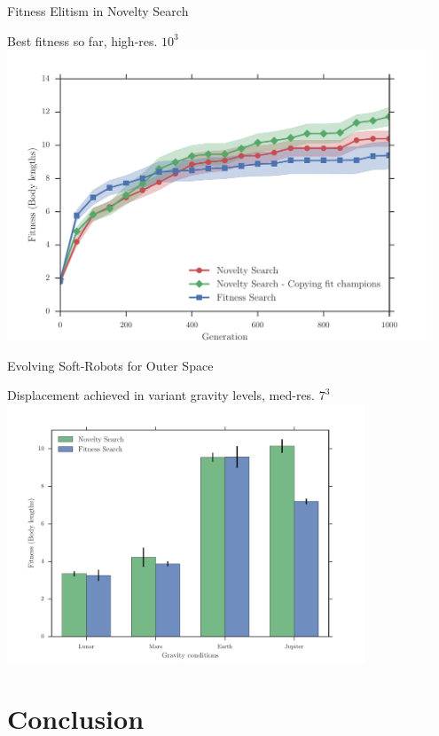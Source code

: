 \documentclass[6pt]{beamer}
\begin{document}
{\begin{frame}{Fitness Elitism in Novelty Search}
\begin{block}{Best fitness so far, high-res. $10^3$}
\centering
\includegraphics[width=0.95\textwidth]{../Figures/Results/CopyFitChampions10.pdf}
\end{block}
\end{frame}

\begin{frame}{Evolving Soft-Robots for Outer Space}
\begin{block}{Displacement achieved in variant gravity levels, med-res. $7^3$}
\centering
\includegraphics[width=0.8\textwidth]{../Figures/Results/GravityExperiment.pdf}
\end{block}
\end{frame}
}








\section{Conclusion}
\end{document}
